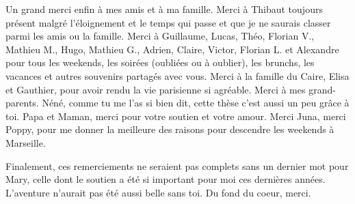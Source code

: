 Un grand merci enfin à mes amis et à ma famille.
Merci à Thibaut toujours présent malgré l'éloignement et le temps qui passe et que je ne saurais classer parmi les amis ou la famille.
Merci à Guillaume, Lucas, Théo, Florian V., Mathieu M., Hugo, Mathieu G., Adrien, Claire, Victor, Florian L. et Alexandre pour tous les weekends, les soirées (oubliées ou à oublier), les brunchs, les vacances et autres souvenirs partagés avec vous.
Merci à la famille du Caire, Elisa et Gauthier, pour avoir rendu la vie parisienne si agréable.
Merci à mes grand-parents.
Néné, comme tu me l'as si bien dit, cette thèse c'est aussi un peu grâce à toi.
Papa et Maman, merci pour votre soutien et votre amour.
Merci Juna, merci Poppy, pour me donner la meilleure des raisons pour descendre les weekends à Marseille.

Finalement, ces remerciements ne seraient pas complets sans un dernier mot pour Mary, celle dont le soutien a été si important pour moi ces dernières années.
L'aventure n'aurait pas été aussi belle sans toi.
Du fond du coeur, merci.